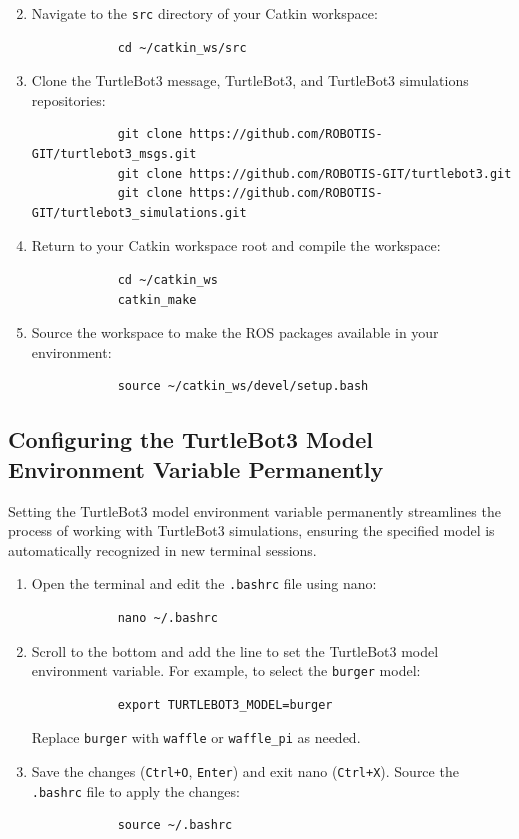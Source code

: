 \documentclass[12pt,a4paper]{article}
\begin{document}
	\begin{enumerate}
		\setcounter{enumi}{1}
		\item Navigate to the \texttt{src} directory of your Catkin workspace:
		\begin{verbatim}
			cd ~/catkin_ws/src
		\end{verbatim}
		
		\item Clone the TurtleBot3 message, TurtleBot3, and TurtleBot3 simulations repositories:
		\begin{verbatim}
			git clone https://github.com/ROBOTIS-GIT/turtlebot3_msgs.git
			git clone https://github.com/ROBOTIS-GIT/turtlebot3.git
			git clone https://github.com/ROBOTIS-GIT/turtlebot3_simulations.git
		\end{verbatim}
		
		\item Return to your Catkin workspace root and compile the workspace:
		\begin{verbatim}
			cd ~/catkin_ws
			catkin_make
		\end{verbatim}
		
		\item Source the workspace to make the ROS packages available in your environment:
		\begin{verbatim}
			source ~/catkin_ws/devel/setup.bash
		\end{verbatim}
	\end{enumerate}
	
	\subsection{Configuring the TurtleBot3 Model Environment Variable Permanently}
	Setting the TurtleBot3 model environment variable permanently streamlines the process of working with TurtleBot3 simulations, ensuring the specified model is automatically recognized in new terminal sessions.
	
	\begin{enumerate}
		\item Open the terminal and edit the \texttt{.bashrc} file using nano:
		\begin{verbatim}
			nano ~/.bashrc
		\end{verbatim}
		
		\item Scroll to the bottom and add the line to set the TurtleBot3 model environment variable. For example, to select the \texttt{burger} model:
		\begin{verbatim}
			export TURTLEBOT3_MODEL=burger
		\end{verbatim}
		Replace \texttt{burger} with \texttt{waffle} or \texttt{waffle\_pi} as needed.
		
		\item Save the changes (\texttt{Ctrl+O}, \texttt{Enter}) and exit nano (\texttt{Ctrl+X}). Source the \texttt{.bashrc} file to apply the changes:
		\begin{verbatim}
			source ~/.bashrc
		\end{verbatim}
	\end{enumerate}
	
\end{document}
